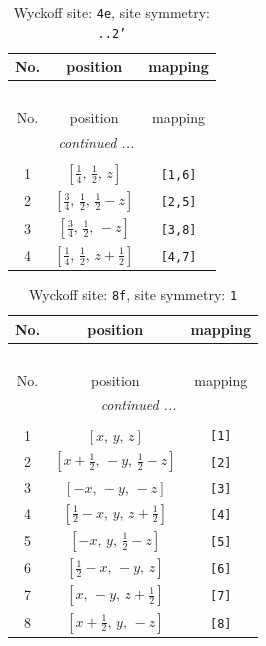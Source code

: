 \documentclass[fleqn,8pt]{jsarticle}
\begin{document}
\renewcommand{\arraystretch}{1.2}
\begin{longtable}{ccc}
\caption{Wyckoff site: {\tt 4e}, site symmetry: {\tt ..2'}}
 \\
 \hline \hline
No. & position & mapping \\ \hline \endfirsthead

\multicolumn{2}{l}{\tablename\ \thetable{}} \\
 \hline \hline
No. & position & mapping \\ \hline \endhead

 \hline \hline
\multicolumn{2}{r}{\footnotesize\it continued ...} \\ \endfoot

 \hline \hline
\multicolumn{2}{r}{} \\ \endlastfoot

1 & $\left[ \frac{1}{4},\, \frac{1}{2},\, z \right]$ & {\tt [1,6]} \\ \hline
2 & $\left[ \frac{3}{4},\, \frac{1}{2},\, \frac{1}{2} - z \right]$ & {\tt [2,5]} \\ \hline
3 & $\left[ \frac{3}{4},\, \frac{1}{2},\, - z \right]$ & {\tt [3,8]} \\ \hline
4 & $\left[ \frac{1}{4},\, \frac{1}{2},\, z + \frac{1}{2} \right]$ & {\tt [4,7]} \\
\end{longtable}
\renewcommand{\arraystretch}{1.2}
\begin{longtable}{ccc}
\caption{Wyckoff site: {\tt 8f}, site symmetry: {\tt 1}}
 \\
 \hline \hline
No. & position & mapping \\ \hline \endfirsthead

\multicolumn{2}{l}{\tablename\ \thetable{}} \\
 \hline \hline
No. & position & mapping \\ \hline \endhead

 \hline \hline
\multicolumn{2}{r}{\footnotesize\it continued ...} \\ \endfoot

 \hline \hline
\multicolumn{2}{r}{} \\ \endlastfoot

1 & $\left[ x,\, y,\, z \right]$ & {\tt [1]} \\ \hline
2 & $\left[ x + \frac{1}{2},\, - y,\, \frac{1}{2} - z \right]$ & {\tt [2]} \\ \hline
3 & $\left[ - x,\, - y,\, - z \right]$ & {\tt [3]} \\ \hline
4 & $\left[ \frac{1}{2} - x,\, y,\, z + \frac{1}{2} \right]$ & {\tt [4]} \\ \hline
5 & $\left[ - x,\, y,\, \frac{1}{2} - z \right]$ & {\tt [5]} \\ \hline
6 & $\left[ \frac{1}{2} - x,\, - y,\, z \right]$ & {\tt [6]} \\ \hline
7 & $\left[ x,\, - y,\, z + \frac{1}{2} \right]$ & {\tt [7]} \\ \hline
8 & $\left[ x + \frac{1}{2},\, y,\, - z \right]$ & {\tt [8]} \\
\end{longtable}
\end{document}
